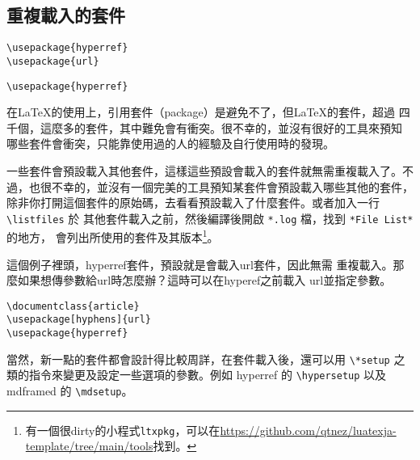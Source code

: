 \subsection{重複載入的套件}

\begin{Wrong}
\begin{verbatim}
\usepackage{hyperref}
\usepackage{url}
\end{verbatim}
\end{Wrong}

\begin{Right}
\begin{verbatim}
\usepackage{hyperref}
\end{verbatim}
\end{Right}

在\LaTeX 的使用上，引用套件（package）是避免不了，但\LaTeX 的套件，超過
四千個，這麼多的套件，其中難免會有衝突。很不幸的，並沒有很好的工具來預知
哪些套件會衝突，只能靠使用過的人的經驗及自行使用時的發現。

一些套件會預設載入其他套件，這樣這些預設會載入的套件就無需重複載入了。不
過，也很不幸的，並沒有一個完美的工具預知某套件會預設載入哪些其他的套件，
除非你打開這個套件的原始碼，去看看預設載入了什麼套件。或者加入一行 \verb|\listfiles| 於
其他套件載入之前，然後編譯後開啟 \verb|*.log| 檔，找到 \verb|*File List*| 的地方，
會列出所使用的套件及其版本\footnote{有一個很dirty的小程式{\tt ltxpkg}，可以在\url{https://github.com/qtnez/luatexja-template/tree/main/tools}找到。}。

這個例子裡頭，{\sf hyperref}套件，預設就是會載入{\sf url}套件，因此無需
重複載入。那麼如果想傳參數給{\sf url}時怎麼辦？這時可以在{\sf hyperef}之前載入
{\sf url}並指定參數。

\begin{Code}
\small
{}
\begin{verbatim}
\documentclass{article}
\usepackage[hyphens]{url}
\usepackage{hyperref}
\end{verbatim}
\end{Code}

當然，新一點的套件都會設計得比較周詳，在套件載入後，還可以用 \verb|\*setup| 之類的指令來變更及設定一些選項的參數。例如 {\sf hyperref} 的 \verb|\hypersetup| 以及 {\sf mdframed} 的 \verb|\mdsetup|。

\marginpar{\back}
